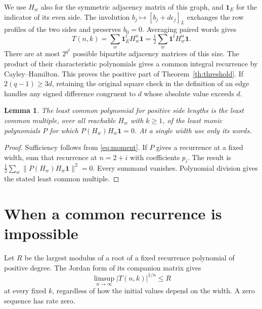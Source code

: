 \documentclass[11pt,letterpaper]{article}
\newtheorem{lemma}[theorem]{Lemma}
\newcommand{\one}{\mathbf 1}
\begin{document}
We use $H_w$ also for the symmetric adjacency matrix of this graph, and $\one_E$ for the indicator of its even side. The involution $b_j\mapsto[b_j+d\epsilon_j]_L$ exchanges the row profiles of the two sides and preserves $b_0=0$. Averaging paired words gives
\begin{equation}\label{eq:moment}
 T(n,k)=\sum_w \one_E^t H_w^n\one
       =\tfrac12\sum_w \one^t H_w^n\one .
\end{equation}
There are at most $2^{q^2}$ possible bipartite adjacency matrices of this size. The product of their characteristic polynomials gives a common integral recurrence by Cayley--Hamilton. This proves the positive part of Theorem~\ref{th:threshold}. If $2(q-1)\ge3d$, retaining the original square check in the definition of an edge handles any signed difference congruent to $d$ whose absolute value exceeds $d$.

\begin{lemma}\label{lem:least}
The least common polynomial for positive side lengths is the least common multiple, over all reachable $H_w$ with $k\ge1$, of the least monic polynomials $P$ for which $P(H_w)H_w\one=0$. At a single width use only its words.
\end{lemma}
\begin{proof}
Sufficiency follows from \eqref{eq:moment}. If $P$ gives a recurrence at a fixed width, sum that recurrence at $n=2+i$ with coefficients $p_i$. The result is $\tfrac12\sum_w\|P(H_w)H_w\one\|^2=0$. Every summand vanishes. Polynomial division gives the stated least common multiple.
\end{proof}

\clearpage
\section{When a common recurrence is impossible}

Let $R$ be the largest modulus of a root of a fixed recurrence polynomial of positive degree. The Jordan form of its companion matrix gives
\[
 \limsup_{n\to\infty}|T(n,k)|^{1/n}\le R
\]
at every fixed $k$, regardless of how the initial values depend on the width. A zero sequence has rate zero.
\end{document}
